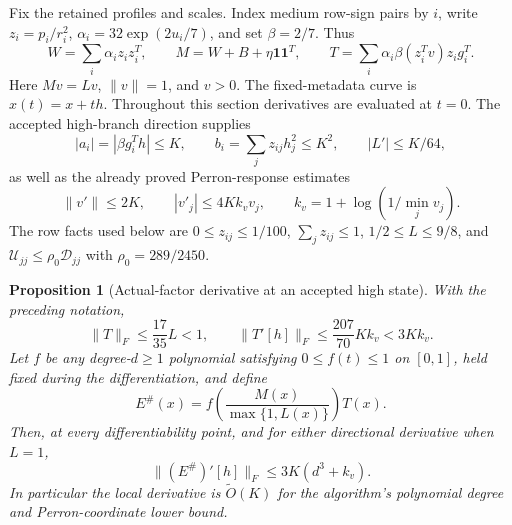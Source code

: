 \documentclass[11pt]{amsart}
\newtheorem{proposition}[theorem]{Proposition}
\theoremstyle{definition}\newtheorem{definition}[theorem]{Definition}
\theoremstyle{remark}\newtheorem{remark}[theorem]{Remark}
\numberwithin{equation}{section}
\begin{document}
Fix the retained profiles and scales. Index medium row-sign pairs by $i$,
write $z_i=p_i/r_i^2$, $\alpha_i=32\exp(2u_i/7)$, and set $\beta=2/7$.
Thus
\[
 W=\sum_i\alpha_i z_i z_i^T,\qquad
 M=W+B+\eta\mathbf1\mathbf1^T,\qquad
 T=\sum_i\alpha_i\beta(z_i^Tv)z_i g_i^T.
\]
Here $Mv=Lv$, $\|v\|=1$, and $v>0$. The fixed-metadata curve is
$x(t)=x+th$. Throughout this section derivatives are evaluated at $t=0$.
The accepted high-branch direction supplies
\[
 |a_i|=|\beta g_i^Th|\le K,\qquad
 b_i=\sum_jz_{ij}h_j^2\le K^2,
 \qquad |L'|\le K/64,
\]
as well as the already proved Perron-response estimates
\[
 \|v'\|\le2K,\qquad |v'_j|\le4Kk_vv_j,
 \qquad k_v=1+\log(1/\min_jv_j).
\]
The row facts used below are $0\le z_{ij}\le1/100$,
$\sum_jz_{ij}\le1$, $1/2\le L\le9/8$, and
$\mathcal U_{jj}\le\rho_0\mathcal D_{jj}$ with
$\rho_0=289/2450$.

\begin{proposition}[Actual-factor derivative at an accepted high state]
With the preceding notation,
\[
 \|T\|_F\le\frac{17}{35}L<1,
 \qquad \|T'[h]\|_F\le\frac{207}{70}Kk_v<3Kk_v.
\]
Let $f$ be any degree-$d\ge1$ polynomial satisfying $0\le f(t)\le1$
on $[0,1]$, held fixed during the differentiation, and define
\[
 E^{\#}(x)=f\!\left(\frac{M(x)}{\max\{1,L(x)\}}\right)T(x).
\]
Then, at every differentiability point, and for either directional
derivative when $L=1$,
\[
 \|(E^{\#})'[h]\|_F\le3K(d^3+k_v).
\]
In particular the local derivative is $\widetilde O(K)$ for the
algorithm's polynomial degree and Perron-coordinate lower bound.
\end{proposition}
\end{document}
